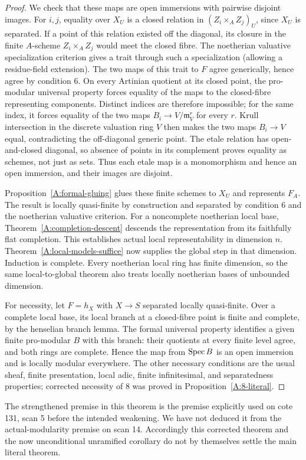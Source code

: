 \begin{proof}
We check that these maps are open immersions with pairwise disjoint
images. For $i,j$, equality over $X_U$ is a closed relation in
$(Z_i\times_A Z_j)_U$, since $X_U$ is separated. If a point of this
relation existed off the diagonal, its closure in the finite
$A$-scheme $Z_i\times_A Z_j$ would meet the closed fibre. The
noetherian valuative specialization criterion gives a trait
through such a specialization (allowing a residue-field extension).
The two maps of this trait to $F$ agree generically, hence agree
by condition 6. On every Artinian quotient at its closed point,
the pro-modular universal property forces equality of the maps
to the closed-fibre representing components. Distinct indices are
therefore impossible; for the same index, it forces equality of
the two maps $B_i\to V/\mathfrak m_V^r$ for every $r$.
Krull intersection in the discrete valuation ring $V$ then makes
the two maps $B_i\to V$ equal, contradicting the off-diagonal
generic point. The etale relation has open-and-closed diagonal,
so absence of points in its complement proves equality as schemes,
not just as sets. Thus each etale map is a monomorphism and hence
an open immersion, and their images are disjoint.

Proposition~\ref{A:formal-gluing} glues these finite schemes to
$X_U$ and represents $F_A$. The result is locally quasi-finite by
construction and separated by condition 6 and the noetherian
valuative criterion. For a noncomplete noetherian local base,
Theorem~\ref{A:completion-descent} descends the representation
from its faithfully flat completion. This establishes actual
local representability in dimension $n$.
Theorem~\ref{A:local-models-suffice} now supplies the global step
in that dimension. Induction is complete. Every noetherian local
ring has finite dimension, so the same local-to-global theorem
also treats locally noetherian bases of unbounded dimension.

For necessity, let $F=h_X$ with $X\to S$ separated locally
quasi-finite. Over a complete local base, its local branch at a
closed-fibre point is finite and complete, by the henselian branch
lemma. The formal universal property identifies a given finite
pro-modular $B$ with this branch: their quotients at every finite
level agree, and both rings are complete. Hence the map from
$\operatorname{Spec} B$ is an open immersion and is locally modular everywhere.
The other necessary conditions are the usual sheaf, finite
presentation, local adic, finite infinitesimal, and separatedness
properties; corrected necessity of 8 was proved in
Proposition~\ref{A:8-literal}.
\end{proof}

The strengthened premise in this theorem is the premise explicitly used
on cote 131, scan 5 before the intended weakening. We have not deduced
it from the actual-modularity premise on scan 14. Accordingly this
corrected theorem and the now unconditional unramified corollary do not
by themselves settle the main literal theorem.
